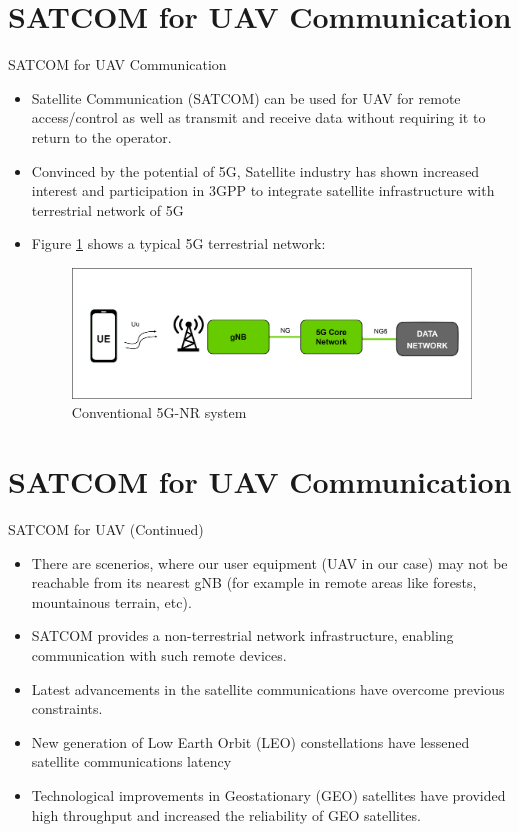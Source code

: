 \documentclass{beamer}
\begin{document}
\section{SATCOM for UAV Communication}
\begin{frame}{SATCOM for UAV Communication}
\begin{itemize}
	\item Satellite Communication (SATCOM) can be used for UAV for remote access/control as well as transmit and receive data without requiring it to return to the operator.
	\item Convinced by the potential of 5G, Satellite industry has shown increased interest and participation in 3GPP to integrate satellite infrastructure with terrestrial network of 5G
	\item Figure \ref{Conventional_5G} shows a typical 5G terrestrial network:
	\begin{figure}[h!]
  		\centering
  		\includegraphics[width=0.9\linewidth]{./figs/Conventional_5G.png}
  		\caption{Conventional 5G-NR system}
  		\label{Conventional_5G}
	\end{figure}
\end{itemize}
\end{frame} 

\section{SATCOM for UAV Communication}
\begin{frame}{SATCOM for UAV \small{(Continued})}
\begin{itemize}
	\item There are scenerios, where our user equipment (UAV in our case) may not be reachable from
its nearest gNB (for example in remote areas like forests, mountainous terrain, etc).
	\item SATCOM provides a non-terrestrial network infrastructure, enabling communication with such
remote devices.
	\item Latest advancements in the satellite communications have overcome previous constraints. 
 \item New generation of Low Earth Orbit (LEO) constellations have lessened satellite communications latency
\item Technological improvements in Geostationary (GEO) satellites have provided high throughput and increased the reliability of GEO satellites.
\end{itemize}
\end{frame} 
\end{document}
